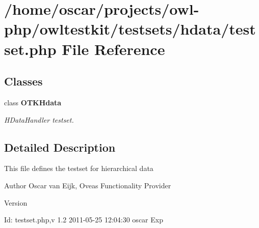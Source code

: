\section{/home/oscar/projects/owl-\/php/owltestkit/testsets/hdata/testset.php File Reference}
\label{hdata_2testset_8php}
\subsection*{Classes}
\begin{DoxyCompactItemize}
\item 
class {\bf OTKHdata}
\begin{DoxyCompactList}\small\item\em HDataHandler testset. \end{DoxyCompactList}\end{DoxyCompactItemize}


\subsection{Detailed Description}
This file defines the testset for hierarchical data \begin{DoxyAuthor}{Author}
Oscar van Eijk, Oveas Functionality Provider 
\end{DoxyAuthor}
\begin{DoxyVersion}{Version}

\end{DoxyVersion}
\begin{DoxyParagraph}{Id:}
testset.php,v 1.2 2011-\/05-\/25 12:04:30 oscar Exp 
\end{DoxyParagraph}
